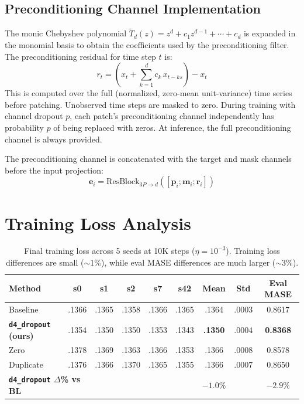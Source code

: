 \documentclass{article}
\begin{document}
\subsection{Preconditioning Channel Implementation}

The monic Chebyshev polynomial $\tilde T_d(z)=z^d+c_1 z^{d-1}+\cdots+c_d$ is expanded in the monomial basis to obtain the coefficients used by the preconditioning filter. The preconditioning residual for time step $t$ is:
\[
r_t = \left(x_t + \sum_{k=1}^{d} c_k \, x_{t-ks}\right) - x_t
\]
This is computed over the full (normalized, zero-mean unit-variance) time series before patching. Unobserved time steps are masked to zero. During training with channel dropout $p$, each patch's preconditioning channel independently has probability $p$ of being replaced with zeros. At inference, the full preconditioning channel is always provided.

The preconditioning channel is concatenated with the target and mask channels before the input projection:
\[
\mathbf{e}_i = \text{ResBlock}_{3P \to d}([\mathbf{p}_i; \mathbf{m}_i; \mathbf{r}_i])
\]

\section{Training Loss Analysis}
\label{app:trainloss}

\begin{table}[H]
\centering
\caption{Final training loss across 5 seeds at 10K steps ($\eta = 10^{-3}$). Training loss differences are small ($\sim$1\%), while eval MASE differences are much larger ($\sim$3\%).}
\small
\begin{tabular}{lcccccccc}
\toprule
\textbf{Method} & \textbf{s0} & \textbf{s1} & \textbf{s2} & \textbf{s7} & \textbf{s42} & \textbf{Mean} & \textbf{Std} & \textbf{Eval MASE} \\
\midrule
Baseline & .1366 & .1365 & .1358 & .1366 & .1365 & .1364 & .0003 & 0.8617 \\
\textbf{\texttt{d4\_dropout} (ours)} & .1354 & .1350 & .1350 & .1353 & .1343 & \textbf{.1350} & .0004 & \textbf{0.8368} \\
Zero & .1378 & .1369 & .1363 & .1366 & .1353 & .1366 & .0008 & 0.8578 \\
Duplicate & .1376 & .1366 & .1370 & .1365 & .1355 & .1366 & .0007 & 0.8650 \\
\midrule
\multicolumn{2}{l}{\textbf{\texttt{d4\_dropout} $\Delta$\% vs BL}} & & & & & $-1.0\%$ & & $-2.9\%$ \\
\bottomrule
\end{tabular}
\end{table}
\end{document}
